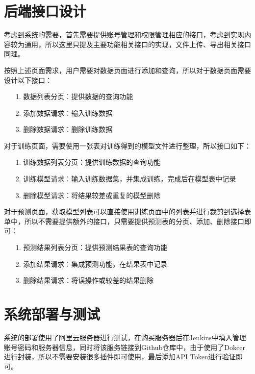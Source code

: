 \section{后端接口设计}

考虑到系统的需要，首先需要提供账号管理和权限管理相应的接口，考虑到实现内容较为通用，所以这里只提及主要功能相关接口的实现，文件上传、导出相关接口同理。

按照上述页面需求，用户需要对数据页面进行添加和查询，所以对于数据页面需要设计以下接口：

\begin{enumerate}
    \item [1.] 数据列表分页：提供数据的查询功能
    \item [2.] 添加数据请求：输入训练数据
    \item [3.] 删除数据请求：删除训练数据
\end{enumerate}

对于训练页面，需要使用一张表对训练得到的模型文件进行整理，所以接口如下：

\begin{enumerate}
    \item [1.] 训练数据列表分页：提供训练数据的查询功能
    \item [2.] 训练模型请求：输入训练数据集，并集成训练，完成后在模型表中记录
    \item [3.] 删除模型请求：将结果较差或重复的模型删除
\end{enumerate}

对于预测页面，获取模型列表可以直接使用训练页面中的列表并进行裁剪到选择表单中，所以不需要提供额外的接口，只需要提供预测表的分页、添加、删除接口即可：

\begin{enumerate}
    \item [1.] 预测结果列表分页：提供预测结果表的查询功能
    \item [2.] 添加结果请求：集成预测功能，在结果表中记录
    \item [3.] 删除结果请求：将误操作或较差的结果删除
\end{enumerate}

\section{系统部署与测试}

系统的部署使用了阿里云服务器进行测试，在购买服务器后在Jenkins中填入管理账号密码和服务器信息，同时将该服务链接到Github仓库中，由于使用了Dokcer进行封装，所以不需要安装很多插件即可使用，最后添加API Token进行验证即可。

